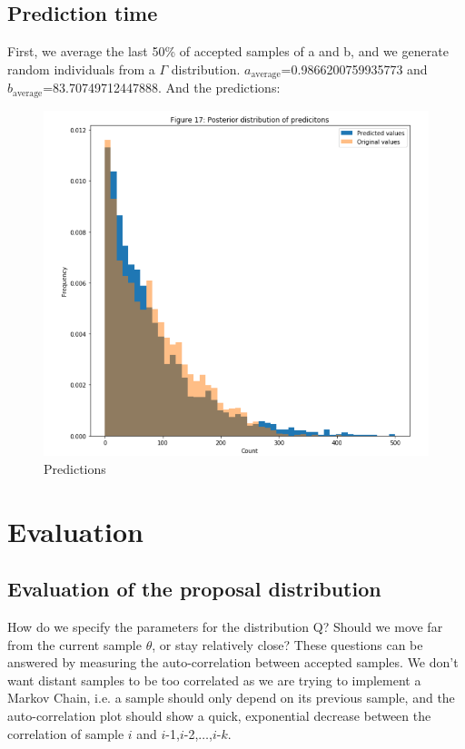 \subsection{Prediction time}
First, we average the last 50\% of accepted samples of a and b, and we generate random individuals from a  $\Gamma$ distribution. $a_\textrm{average}$=0.9866200759935773 and $b_\textrm{average}$=83.70749712447888.
And the predictions:

\begin{figure}[h]
    \centering
\includegraphics[width=.8\textwidth]{pic/p05c09-snip15}
    \caption{Predictions}
    \label{fig:p05c09-snip15}
\end{figure}

\FloatBarrier
\section{Evaluation}
\subsection{Evaluation of the proposal distribution}
How do we specify the parameters for the distribution Q? Should we move far from the current sample $\theta$, or stay relatively close? These questions can be answered by measuring the auto-correlation between accepted samples. We don't want distant samples to be too correlated as we are trying to implement a Markov Chain, i.e. a sample should only depend on its previous sample, and the auto-correlation plot should show a quick, exponential decrease between the correlation of sample $i$ and $i$-1,$i$-2,$\ldots$,$i$-$k$.

